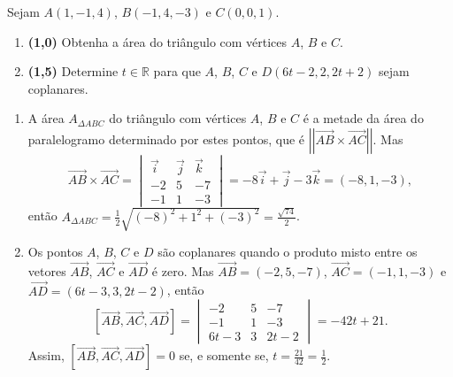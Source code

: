 \documentclass[12pt,a4paper]{article}
\newcommand*\R{\mathbb{R}}
\newcommand{\vect}[1]{\overrightarrow{#1}}
\newcommand{\norm}[1]{\left|\left|{#1}\right|\right|}
\begin{document}
\begin{ExerciseList}
\Exercise[title={2,5}] Sejam $A(1,-1,4)$, $B(-1,4,-3)$ e $C(0,0,1)$.
\begin{enumerate}
\item \textbf{(1,0)} Obtenha a área do triângulo com vértices $A$, $B$ e $C$.
\item \textbf{(1,5)} Determine $t \in \R$ para que $A$, $B$, $C$ e $D(6t-2, 2, 2t+2)$ sejam coplanares.
\end{enumerate}
\Answer
\begin{enumerate}
\item A área $A_{\Delta ABC}$ do triângulo com vértices $A$, $B$ e $C$ é a metade da área do paralelogramo determinado por estes pontos, que é $\norm{ \vect{AB} \times \vect{AC} }$. Mas
\[
\vect{AB} \times \vect{AC}
= \begin{vmatrix}
\vec{i} & \vec{j} & \vec{k} \\
-2 & 5 & -7 \\
-1 & 1 & -3
\end{vmatrix}
= -8 \vec{i} + \vec{j} -3 \vec{k}
= (-8, 1, -3),
\]
então $A_{\Delta ABC} = \frac{1}{2} \sqrt{ (-8)^2 + 1^2 + (-3)^2 } = \frac{\sqrt{74}}{2}$.

\item Os pontos $A$, $B$, $C$ e $D$ são coplanares quando o produto misto entre os vetores $\vect{AB}$, $\vect{AC}$ e $\vect{AD}$ é zero. Mas $\vect{AB} = (-2,5,-7)$, $\vect{AC} = (-1,1,-3)$ e $\vect{AD}=(6t-3, 3, 2t-2)$, então
\[
[ \vect{AB}, \vect{AC}, \vect{AD} ]
=
\begin{vmatrix}
-2 & 5 & -7\\
-1 & 1 & -3\\
6t-3 & 3 & 2t-2
\end{vmatrix}
= -42t + 21.
\]
Assim, $[ \vect{AB}, \vect{AC}, \vect{AD} ] = 0$ se, e somente se, $t = \frac{21}{42} = \frac{1}{2}$.
\end{enumerate}


\end{ExerciseList}
\end{document}
